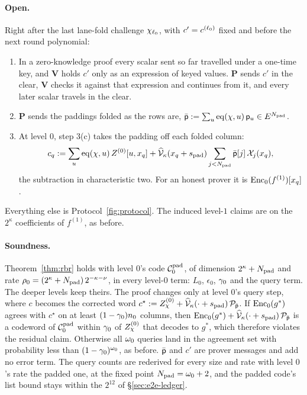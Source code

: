 \paragraph{Open.} Right after the last lane-fold challenge $\chi_{\ell_0}$, with $c' = c^{(\ell_0)}$ fixed and before the next round polynomial:
\begin{enumerate}[itemsep=1pt,topsep=2pt]
\item In a zero-knowledge proof every scalar sent so far travelled under a one-time key, and $\mathbf{V}$ holds $c'$ only as an expression of keyed values. $\mathbf{P}$ sends $c'$ in the clear, $\mathbf{V}$ checks it against that expression and continues from it, and every later scalar travels in the clear.
\item $\mathbf{P}$ sends the paddings folded as the rows are, $\bar{\mathsf{p}} := \sum_{u} \operatorname{eq}(\chi, u)\, \mathsf{p}_u \in E^{N_{\mathrm{pad}}}$.
\item At level $0$, step 3(c) takes the padding off each folded column:
\[
c_q := \sum_{u} \operatorname{eq}(\chi, u)\, Z^{(0)}[u, x_q] + \widehat{\mathcal{V}}_{\kappa}(x_q + s_{\mathrm{pad}}) \sum_{j < N_{\mathrm{pad}}} \bar{\mathsf{p}}[j]\, \mathcal{X}_j(x_q),
\]
the subtraction in characteristic two. For an honest prover it is $\mathrm{Enc}_0(f^{(1)})[x_q]$.
\end{enumerate}
Everything else is Protocol~\ref{fig:protocol}. The induced level-$1$ claims are on the $2^\kappa$ coefficients of $f^{(1)}$, as before.

\paragraph{Soundness.} Theorem~\ref{thm:rbr} holds with level $0$'s code $\mathcal{C}^{\mathrm{pad}}_0$, of dimension $2^\kappa + N_{\mathrm{pad}}$ and rate $\rho_0 = (2^\kappa + N_{\mathrm{pad}})\, 2^{-\kappa - \nu}$, in every level-$0$ term: $L_0$, $\epsilon_0$, $\gamma_0$ and the query term. The deeper levels keep theirs. The proof changes only at level $0$'s query step, where $c$ becomes the corrected word $c^\star := Z^{(0)}_\chi + \widehat{\mathcal{V}}_{\kappa}(\cdot + s_{\mathrm{pad}})\, \mathcal{P}_{\bar{\mathsf{p}}}$. If $\mathrm{Enc}_0(g^\ast)$ agrees with $c^\star$ on at least $(1 - \gamma_0)n_0$ columns, then $\mathrm{Enc}_0(g^\ast) + \widehat{\mathcal{V}}_{\kappa}(\cdot + s_{\mathrm{pad}})\, \mathcal{P}_{\bar{\mathsf{p}}}$ is a codeword of $\mathcal{C}^{\mathrm{pad}}_0$ within $\gamma_0$ of $Z^{(0)}_\chi$ that decodes to $g^\ast$, which therefore violates the residual claim. Otherwise all $\omega_0$ queries land in the agreement set with probability less than $(1 - \gamma_0)^{\omega_0}$, as before. $\bar{\mathsf{p}}$ and $c'$ are prover messages and add no error term. The query counts are rederived for every size and rate with level $0$'s rate the padded one, at the fixed point $N_{\mathrm{pad}} = \omega_0 + 2$, and the padded code's list bound stays within the $2^{12}$ of \S\ref{sec:e2e-ledger}.


